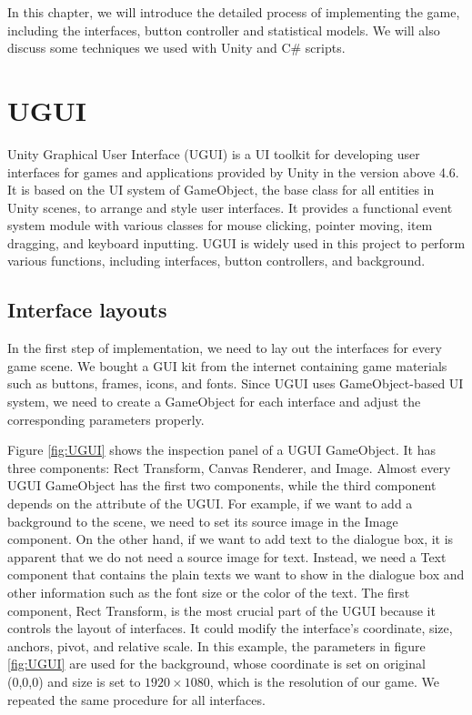 \documentclass[msc,deptreport,ai]{infthesis}      %
\begin{document}
In this chapter, we will introduce the detailed process of implementing the game, including the interfaces, button controller and statistical models. We will also discuss some techniques we used with Unity and C\# scripts.

\section{UGUI}

Unity Graphical User Interface (UGUI) is a UI toolkit for developing user interfaces for games and applications provided by Unity in the version above 4.6. It is based on the UI system of GameObject, the base class for all entities in Unity scenes, to arrange and style user interfaces. It provides a functional event system module with various classes for mouse clicking, pointer moving, item dragging, and keyboard inputting. UGUI is widely used in this project to perform various functions, including interfaces, button controllers, and background.

\subsection{Interface layouts}
\label{section:interface}

In the first step of implementation, we need to lay out the interfaces for every game scene. We bought a GUI kit from the internet containing game materials such as buttons, frames, icons, and fonts. Since UGUI uses GameObject-based UI system, we need to create a GameObject for each interface and adjust the corresponding parameters properly. 

Figure \ref{fig:UGUI} shows the inspection panel of a UGUI GameObject. It has three components: Rect Transform, Canvas Renderer, and Image. Almost every UGUI GameObject has the first two components, while the third component depends on the attribute of the UGUI. For example, if we want to add a background to the scene, we need to set its source image in the Image component. On the other hand, if we want to add text to the dialogue box, it is apparent that we do not need a source image for text. Instead, we need a Text component that contains the plain texts we want to show in the dialogue box and other information such as the font size or the color of the text. The first component, Rect Transform, is the most crucial part of the UGUI because it controls the layout of interfaces. It could modify the interface's coordinate, size, anchors, pivot, and relative scale. In this example, the parameters in figure \ref{fig:UGUI} are used for the background, whose coordinate is set on original (0,0,0) and size is set to $1920\times1080$, which is the resolution of our game. We repeated the same procedure for all interfaces.
\end{document}
